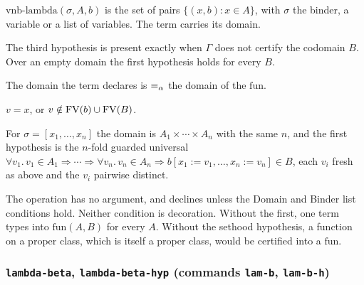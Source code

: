 $\mathrm{vnb\text{-}lambda}(\sigma, A, b)$ is the set of pairs
$\{(x, b) : x \in A\}$, with $\sigma$ the binder, a variable or a list of
variables.  The term carries its domain.
\label{kop:lambda-type}%
\begin{VNBcond}
\item[Definedness] The third hypothesis is present exactly when
  $\Gamma$ does not certify the codomain $B$.  Over an empty domain the
  first hypothesis holds for every $B$.
\item[Domain] The domain the term declares is $=_{\alpha}$ the domain of the
  $\mathrm{fun}$.
\item[Freshness] $v = x$, or $v \notin \mathrm{FV}(b) \cup \mathrm{FV}(B)$.
\item[Binder list] For $\sigma = [x_1, \ldots, x_n]$ the domain is
  $A_1 \times \cdots \times A_n$ with the same $n$, and the first
  hypothesis is the $n$-fold guarded universal
  $\forall v_1.\, v_1 \in A_1 \Rightarrow \cdots \Rightarrow
   \forall v_n.\, v_n \in A_n \Rightarrow b[x_1{:=}v_1, \ldots, x_n{:=}v_n] \in B$,
  each $v_i$ fresh as above and the $v_i$ pairwise distinct.
\end{VNBcond}
The operation has no argument, and declines unless the Domain and Binder
list conditions hold.  Neither condition is decoration.  Without the
first, one term types into $\mathrm{fun}(A, B)$ for every $A$.  Without
the sethood hypothesis, a function on a proper class, which is itself a
proper class, would be certified into a $\mathrm{fun}$.

\subsubsection*{\texttt{lambda-beta}, \texttt{lambda-beta-hyp}
  (commands \texttt{lam-b}, \texttt{lam-b-h})}

